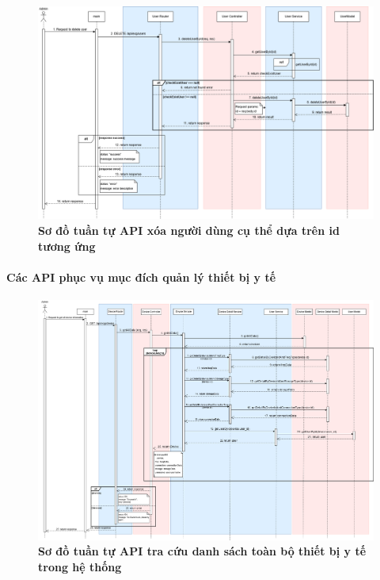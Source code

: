\begin{figure}[H]
	\centering
	\includegraphics[width=16cm]{Images/api_sequence/user/deleteUserById.drawio.png}
	\caption[Sơ đồ tuần tự API xóa người dùng cụ thể dựa trên id tương ứng]{\bfseries \fontsize{12pt}{0pt}\selectfont Sơ đồ tuần tự API xóa người dùng cụ thể dựa trên id tương ứng}
	\label{sequence_diagram_delete_user}
\end{figure}

\paragraph{Các API phục vụ mục đích quản lý thiết bị y tế}
\mbox{}
\begin{figure}[H]
	\centering
	\includegraphics[width=16cm]{Images/api_sequence/device/device-GetAllDevice.drawio.png}
	\caption[Sơ đồ tuần tự API tra cứu danh sách toàn bộ thiết bị y tế trong hệ thống]{\bfseries \fontsize{12pt}{0pt}\selectfont Sơ đồ tuần tự API tra cứu danh sách toàn bộ thiết bị y tế trong hệ thống}
	\label{sequence_diagram_get_all_devices}
\end{figure}

